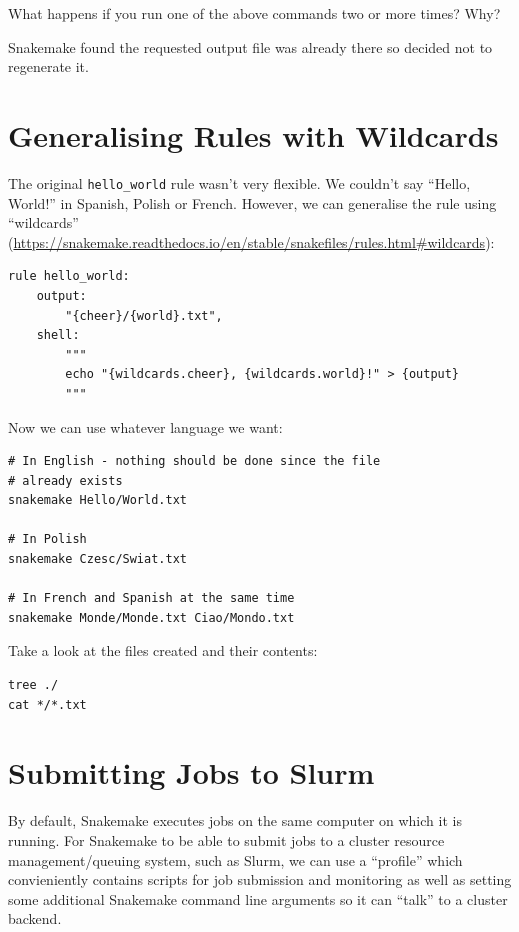\begin{questions}

What happens if you run one of the above commands two or more times? Why?

\begin{answer}
Snakemake found the requested output file was already there so decided not to regenerate it.
\end{answer}

\end{questions}


\section{Generalising Rules with Wildcards}

The original \texttt{hello\_world} rule wasn't very flexible. We couldn't say ``Hello, World!'' in Spanish, Polish
or French. However, we can generalise the rule using ``wildcards'' (\url{https://snakemake.readthedocs.io/en/stable/snakefiles/rules.html#wildcards}):

\begin{lstlisting}
rule hello_world:
	output:
		"{cheer}/{world}.txt",
	shell:
		"""
		echo "{wildcards.cheer}, {wildcards.world}!" > {output}
		"""
\end{lstlisting}

Now we can use whatever language we want:

\begin{lstlisting}
# In English - nothing should be done since the file
# already exists
snakemake Hello/World.txt

# In Polish
snakemake Czesc/Swiat.txt

# In French and Spanish at the same time
snakemake Monde/Monde.txt Ciao/Mondo.txt
\end{lstlisting}

Take a look at the files created and their contents:

\begin{lstlisting}
tree ./
cat */*.txt
\end{lstlisting}

\section{Submitting Jobs to Slurm}

By default, Snakemake executes jobs on the same computer on which it is running. For Snakemake to be able to
submit jobs to a cluster resource management/queuing system, such as Slurm, we can use a ``profile'' which
convieniently contains scripts for job submission and monitoring as well as setting some additional Snakemake
command line arguments so it can ``talk'' to a cluster backend.

